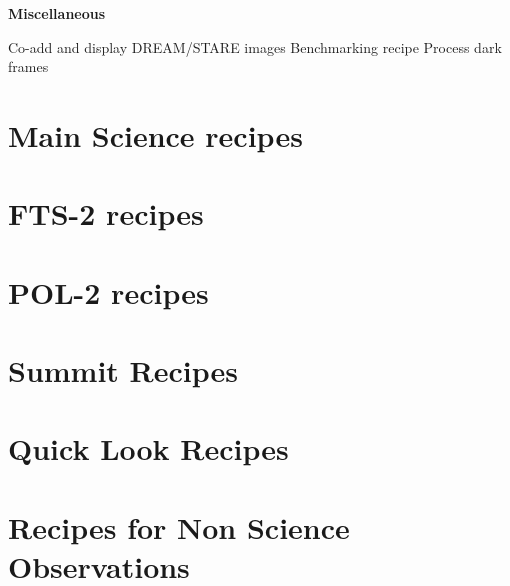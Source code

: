\documentclass[twoside,11pt,nolof]{starlink}
\begin{document}
\begin{small}
{\large
\begin{center}
\textbf{Miscellaneous}
\end{center}
}
\begin{description}
Co-add and display DREAM/STARE images
Benchmarking recipe
Process dark frames
\end{description}


\end{small}


\section{Main Science recipes}


\section{FTS-2 recipes}


\section{POL-2 recipes}


\section{Summit Recipes}


\section{Quick Look Recipes}


\section{Recipes for Non Science Observations}

\end{document}
